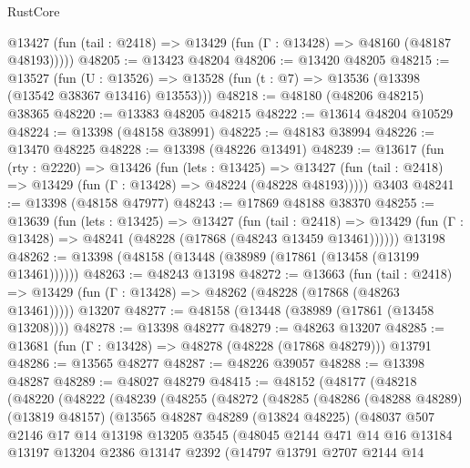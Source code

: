 \begin{lexlean}{RustCore}
\begin{coremodule}
      @13427 (fun (tail : @2418) => @13429 (fun (Γ : @13428) => @48160 (@48187 @48193)))))
@48205 := @13423 @48204
@48206 := @13420 @48205
@48215 := @13527
    (fun (U : @13526) => @13528 (fun (t : @7) => @13536 (@13398 (@13542 @38367 @13416) @13553)))
@48218 := @48180 (@48206 @48215) @38365
@48220 := @13383 @48205 @48215
@48222 := @13614 @48204 @10529
@48224 := @13398 (@48158 @38991)
@48225 := @48183 @38994
@48226 := @13470 @48225
@48228 := @13398 (@48226 @13491)
@48239 := @13617
    (fun (rty : @2220) =>
    @13426
      (fun (lets : @13425) =>
      @13427 (fun (tail : @2418) => @13429 (fun (Γ : @13428) => @48224 (@48228 @48193)))))
    @3403
@48241 := @13398 (@48158 @47977)
@48243 := @17869 @48188 @38370
@48255 := @13639
    (fun (lets : @13425) =>
    @13427
      (fun (tail : @2418) =>
      @13429 (fun (Γ : @13428) => @48241 (@48228 (@17868 (@48243 @13459 @13461))))))
    @13198
@48262 := @13398 (@48158 (@13448 (@38989 (@17861 (@13458 (@13199 @13461))))))
@48263 := @48243 @13198
@48272 := @13663
    (fun (tail : @2418) => @13429 (fun (Γ : @13428) => @48262 (@48228 (@17868 (@48263 @13461)))))
    @13207
@48277 := @48158 (@13448 (@38989 (@17861 (@13458 @13208))))
@48278 := @13398 @48277
@48279 := @48263 @13207
@48285 := @13681 (fun (Γ : @13428) => @48278 (@48228 (@17868 @48279))) @13791
@48286 := @13565 @48277
@48287 := @48226 @39057
@48288 := @13398 @48287
@48289 := @48027 @48279
@48415 := @48152
    (@48177
      (@48218
        (@48220
          (@48222
            (@48239
              (@48255
                (@48272
                  (@48285
                    (@48286
                      (@48288 @48289)
                      (@13819 @48157)
                      (@13565
                        @48287
                        @48289
                        (@13824 @48225)
                        (@48037
                          @507
                          @2146
                          @17
                          @14
                          @13198
                          @13205
                          @3545
                          (@48045
                            @2144
                            @471
                            @14
                            @16
                            @13184
                            @13197
                            @13204
                            @2386
                            @13147
                            @2392
                            (@14797
                              @13791
                              @2707
                              @2144
                              @14

\end{coremodule}
\end{lexlean}
